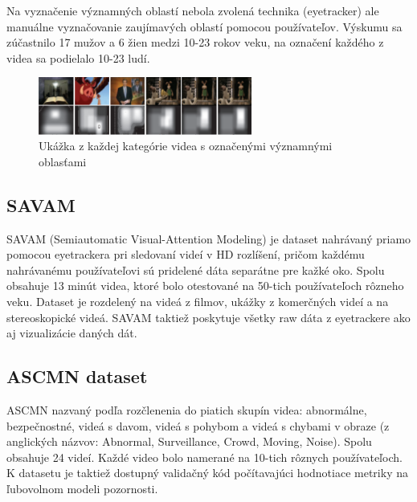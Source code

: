 Na vyznačenie významných oblastí nebola zvolená technika (eyetracker) ale manuálne vyznačovanie zaujímavých oblastí pomocou používateľov.
Výskumu sa zúčastnilo 17 mužov a 6 žien medzi 10-23 rokov veku, na označení každého z videa sa podielalo 10-23 ludí.

\begin{figure}[H]
 \centering
 \includegraphics[width=7cm]{pics/rsd.png}
 \caption{Ukážka z každej kategórie videa s označenými významnými oblasťami}
\end{figure}
\vspace{10mm}

\subsection{SAVAM}
SAVAM (Semiautomatic Visual-Attention Modeling) je dataset nahrávaný priamo pomocou eyetrackera pri sledovaní videí v HD rozlíšení, pričom každému nahrávanému používateľovi sú pridelené dáta separátne pre kažké oko.
Spolu obsahuje 13 minút videa, ktoré bolo otestované na 50-tich používateľoch rôzneho veku.
Dataset je rozdelený na videá z filmov, ukážky z komerčných videí a na stereoskopické videá.
SAVAM taktiež poskytuje všetky raw dáta z eyetrackere ako aj vizualizácie daných dát\cite{savam}.

\subsection{ASCMN dataset}
ASCMN nazvaný podľa rozčlenenia do piatich skupín videa: abnormálne, bezpečnostné, videá s davom, videá s pohybom a videá s chybami v obraze (z anglických názvov: Abnormal, Surveillance, Crowd, Moving, Noise).
Spolu obsahuje 24 videí.
Každé video bolo namerané na 10-tich rôznych používateľoch.
K datasetu je taktiež dostupný validačný kód\cite{accv} počítavajúci hodnotiace metriky na ľubovolnom modeli pozornosti.

